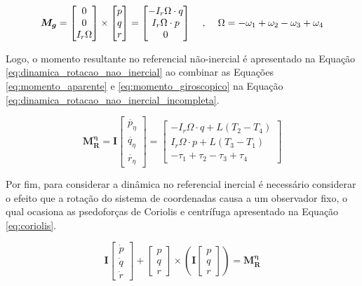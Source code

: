 \documentclass[main.tex]{subfiles}
\begin{document}
\begin{equation}\label{eq:momento_giroscopico}
	\boldsymbol{M_g} = \begin{bmatrix}
		0\\
		0\\
		I_r\Omega
	\end{bmatrix} \times \begin{bmatrix}
		p\\
		q\\
		r
	\end{bmatrix} = \begin{bmatrix}
		- I_r\Omega\cdot q\\
		I_r\Omega\cdot p\\
		0
	\end{bmatrix} \hspace{0.4cm} , \hspace{0.4cm} \Omega = -\omega_1 + \omega_2 - \omega_3 + \omega_4
\end{equation}

 Logo, o momento resultante no referencial não-inercial é apresentado na Equação \ref{eq:dinamica_rotacao_nao_inercial} ao combinar as Equações \ref{eq:momento_aparente} e \ref{eq:momento_giroscopico} na Equação \ref{eq:dinamica_rotacao_nao_inercial_incompleta}.

\begin{equation}\label{eq:dinamica_rotacao_nao_inercial}
	\boldsymbol{M^\eta_R} = \boldsymbol{I} \begin{bmatrix}
		\dot{p_\eta}\\
		\dot{q_\eta}\\
		\dot{r_\eta}
	\end{bmatrix} = \begin{bmatrix}
	- I_r\Omega\cdot q + L(T_2 - T_4)\\
	I_r\Omega\cdot p + L(T_3 - T_1)\\
	-\tau_1 + \tau_2 - \tau_3 + \tau_4
	\end{bmatrix}
\end{equation}

Por fim, para considerar a dinâmica no referencial inercial é necessário considerar o efeito que a rotação do sistema de coordenadas causa a um observador fixo, o qual ocasiona as psedoforças de Coriolis e centrífuga \cite{classica:livro} apresentado na Equação \ref{eq:coriolis}.

\begin{equation}\label{eq:coriolis}
	\boldsymbol{I}\begin{bmatrix}
		\dot{p}\\
		\dot{q}\\
		\dot{r}
	\end{bmatrix} + \begin{bmatrix}
		p\\
		q\\
		r
	\end{bmatrix}\times\left(\boldsymbol{I}\begin{bmatrix}
	p\\
	q\\
	r
	\end{bmatrix}\right) = \boldsymbol{M^\eta_R}
\end{equation}
\end{document}
